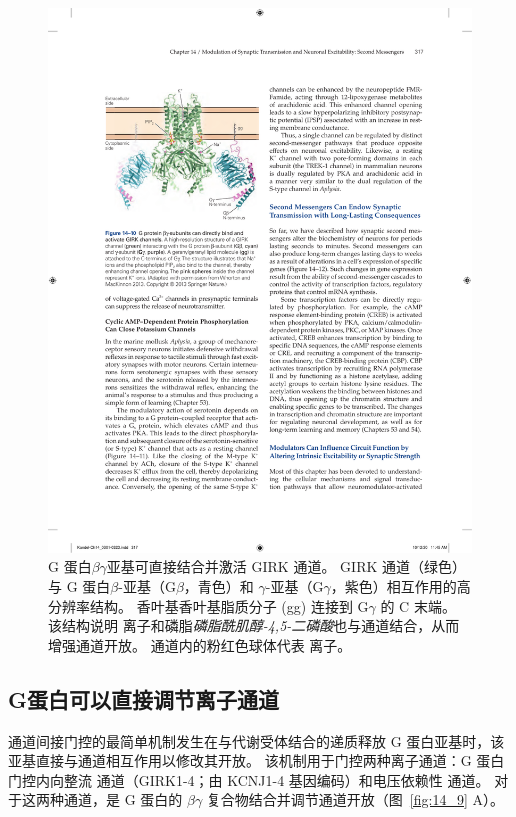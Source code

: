 \begin{figure}[htbp]
	\centering
	\includegraphics[width=0.5\linewidth]{chap14/fig_14_10}
	\caption{G 蛋白$\beta\gamma$亚基可直接结合并激活 GIRK 通道。
		GIRK 通道（绿色）与 G 蛋白$\beta$-亚基（G$\beta$，青色）和 $\gamma$-亚基（G$\gamma$，紫色）相互作用的高分辨率结构。
		香叶基香叶基脂质分子 (gg) 连接到 G$\gamma$ 的 C 末端。
		该结构说明  离子和磷脂\textit{磷脂酰肌醇-4,5-二磷酸}也与通道结合，从而增强通道开放。
		通道内的粉红色球体代表  离子\cite{whorton2013x}。}
	\label{fig:14_10}
\end{figure}



\subsection{G蛋白可以直接调节离子通道}

通道间接门控的最简单机制发生在与代谢受体结合的递质释放 G 蛋白亚基时，该亚基直接与通道相互作用以修改其开放。
该机制用于门控两种离子通道：G 蛋白门控内向整流  通道（GIRK1-4；由 KCNJ1-4 基因编码）和电压依赖性  通道。
对于这两种通道，是 G 蛋白的 $\beta \gamma$ 复合物结合并调节通道开放（图~\ref{fig:14_9} A）。


